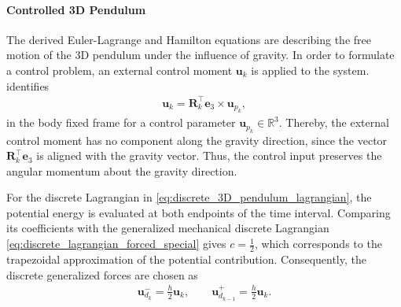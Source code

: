 \paragraph{Controlled 3D Pendulum}

The derived Euler-Lagrange and Hamilton equations are describing the free
motion of the 3D pendulum under the influence of gravity. In order to formulate a control problem,
an external control moment $\bm{u}_k$ is applied to the system. \cite{Lee2008} identifies 
\begin{align}\label{eq:external_control_moment_3D_pendulum}
    \bm{u}_k = \bm{R}_k^\top \bm{e}_3 \times \bm{u}_{p_{k}},
\end{align}
in the body fixed frame for a control parameter $\bm{u}_{p_{k}} \in \mathbb{R}^3$. Thereby, the external control moment has no component
along the gravity direction, since the vector $\bm{R}_k^\top \bm{e}_3$ is aligned with the gravity vector. Thus, the
control input preserves the angular momentum about the gravity direction.

For the discrete Lagrangian in
\eqref{eq:discrete_3D_pendulum_lagrangian}, the potential energy is evaluated at
both endpoints of the time interval. Comparing its coefficients with the generalized
mechanical discrete Lagrangian \eqref{eq:discrete_lagrangian_forced_special} gives $c=\frac{1}{2}$,
which corresponds to the trapezoidal approximation of the potential contribution. Consequently, the discrete 
generalized forces are chosen as
\begin{align}\label{eq:generalized_forced_3D_pendulum}
    \bm{u}_{d_k}^{-}
    =
    \frac{h}{2}\bm{u}_k,
    \qquad
    \bm{u}_{d_{k-1}}^{+}
    =
    \frac{h}{2}\bm{u}_{k}.
\end{align}

